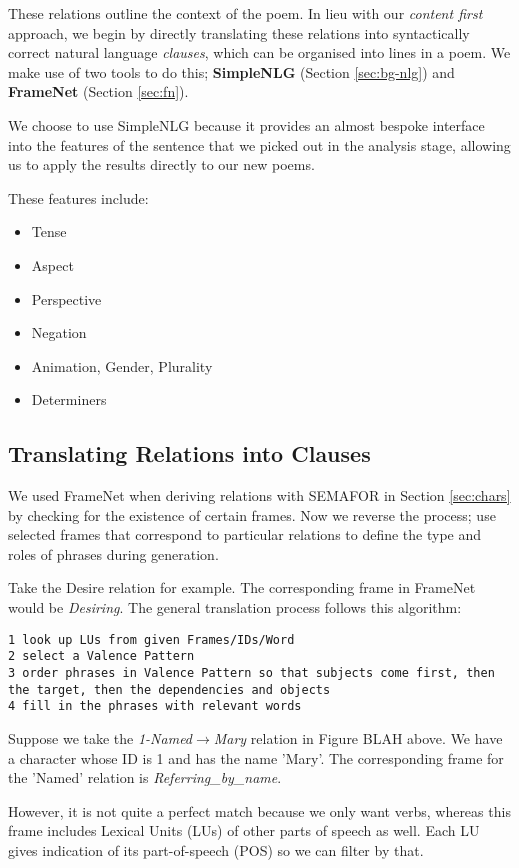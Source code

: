 These relations outline the context of the poem. In lieu with our \textit{content first} approach, we begin by directly translating these relations into syntactically correct natural language \textit{clauses}, which can be organised into lines in a poem. We make use of two tools to do this; \textbf{SimpleNLG} (Section \ref{sec:bg-nlg}) and \textbf{FrameNet} (Section \ref{sec:fn}).

We choose to use SimpleNLG because it provides an almost bespoke interface into the features of the sentence that we picked out in the analysis stage, allowing us to apply the results directly to our new poems.

These features include:
\begin{itemize}
\item{Tense}
\item{Aspect}
\item{Perspective}
\item{Negation}
\item{Animation, Gender, Plurality}
\item{Determiners}
\end{itemize}

\subsection{Translating Relations into Clauses}
We used FrameNet when deriving relations with SEMAFOR in Section \ref{sec:chars} by checking for the existence of certain frames. Now we reverse the process; use selected frames that correspond to particular relations to define the type and roles of phrases during generation.

Take the Desire relation for example. The corresponding frame in FrameNet would be \textit{Desiring}. The general translation process follows this algorithm:

\begin{verbatim}
1 look up LUs from given Frames/IDs/Word
2 select a Valence Pattern
3 order phrases in Valence Pattern so that subjects come first, then the target, then the dependencies and objects
4 fill in the phrases with relevant words
\end{verbatim}

Suppose we take the \textit{1-Named$\rightarrow$Mary} relation in Figure BLAH above. We have a character whose ID is 1 and has the name 'Mary'. The corresponding frame for the 'Named' relation is \textit{Referring\_by\_name}. 

However, it is not quite a perfect match because we only want verbs, whereas this frame includes Lexical Units (LUs) of other parts of speech as well. Each LU gives indication of its part-of-speech (POS) so we can filter by that. 

